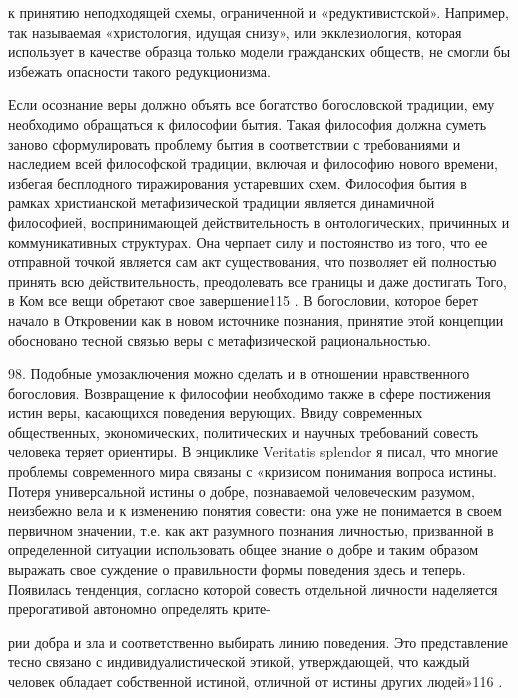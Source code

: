 \documentclass[a5paper,10pt]{article}
\begin{document}
к принятию неподходящей схемы, ограниченной и «редуктивистской». Например, так
называемая «христология, идущая снизу», или экклезиология, которая использует в
качестве образца только модели гражданских обществ, не смогли бы избежать
опасности такого редукционизма.

Если осознание веры должно объять все богатство богословской традиции, ему
необходимо обращаться к философии бытия. Такая философия должна суметь заново
сформулировать проблему бытия в соответствии с требованиями и наследием всей
философской традиции, включая и философию нового времени, избегая бесплодного
тиражирования устаревших схем. Философия бытия в рамках христианской
метафизической традиции является динамичной философией, воспринимающей
действительность в онтологических, причинных и коммуникативных структурах. Она
черпает силу и постоянство из того, что ее отправной точкой является сам акт
существования, что позволяет ей полностью принять всю действительность,
преодолевать все границы и даже достигать Того, в Ком все вещи обретают свое
завершение115 . В богословии, которое берет начало в Откровении как в новом
источнике познания, принятие этой концепции обосновано тесной связью веры с
метафизической рациональностью.

98. Подобные умозаключения можно сделать и в отношении нравственного
богословия. Возвращение к философии необходимо также в сфере постижения истин
веры, касающихся поведения верующих. Ввиду современных общественных,
экономических, политических и научных требований совесть человека теряет
ориентиры. В энциклике Veritatis splendor я писал, что многие проблемы
современного мира связаны с «кризисом понимания вопроса истины. Потеря
универсальной истины о добре, познаваемой человеческим разумом, неизбежно вела
и к изменению понятия совести: она уже не понимается в своем первичном
значении, т.е. как акт разумного познания личностью, призванной в определенной
ситуации использовать общее знание о добре и таким образом выражать свое
суждение о правильности формы поведения здесь и теперь. Появилась тенденция,
согласно которой совесть отдельной личности наделяется прерогативой автономно
определять крите-

рии добра и зла и соответственно выбирать линию поведения. Это представление
тесно связано с индивидуалистической этикой, утверждающей, что каждый человек
обладает собственной истиной, отличной от истины других людей»116 .
\end{document}
